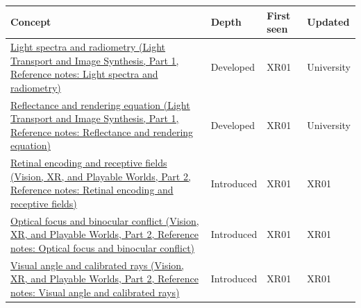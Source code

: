 {\def\LTcaptype{none} %
\begin{longtable}[]{@{}
  >{\raggedright\arraybackslash}p{}
  >{\raggedright\arraybackslash}p{}
  >{\raggedright\arraybackslash}p{}
  >{\raggedright\arraybackslash}p{}@{}}
\toprule\noalign{}
\begin{minipage}[b]{\linewidth}\raggedright
Concept
\end{minipage} & \begin{minipage}[b]{\linewidth}\raggedright
Depth
\end{minipage} & \begin{minipage}[b]{\linewidth}\raggedright
First seen
\end{minipage} & \begin{minipage}[b]{\linewidth}\raggedright
Updated
\end{minipage} \\
\midrule\noalign{}
\endhead
\bottomrule\noalign{}
\endlastfoot
\href{../04-Light-Transport-and-Image-Synthesis-P01/main.pdf\#nameddest=appendix-215c2570199b}{Light spectra and radiometry (Light Transport and Image Synthesis, Part 1, Reference notes: Light spectra and radiometry)} & Developed & XR01 & University \\
\href{../04-Light-Transport-and-Image-Synthesis-P01/main.pdf\#nameddest=appendix-96da0b153b77}{Reflectance and rendering equation (Light Transport and Image Synthesis, Part 1, Reference notes: Reflectance and rendering equation)} & Developed & XR01 & University \\
\href{../07-Vision-XR-and-Playable-Worlds-P02/main.pdf\#nameddest=appendix-7281c15ac44a}{Retinal encoding and receptive fields (Vision, XR, and Playable Worlds, Part 2, Reference notes: Retinal encoding and receptive fields)} & Introduced & XR01 & XR01 \\
\href{../07-Vision-XR-and-Playable-Worlds-P02/main.pdf\#nameddest=appendix-f90cee1be7a4}{Optical focus and binocular conflict (Vision, XR, and Playable Worlds, Part 2, Reference notes: Optical focus and binocular conflict)} & Introduced & XR01 & XR01 \\
\href{../07-Vision-XR-and-Playable-Worlds-P02/main.pdf\#nameddest=appendix-7d356c396d1a}{Visual angle and calibrated rays (Vision, XR, and Playable Worlds, Part 2, Reference notes: Visual angle and calibrated rays)} & Introduced & XR01 & XR01 \\

\end{longtable}}

